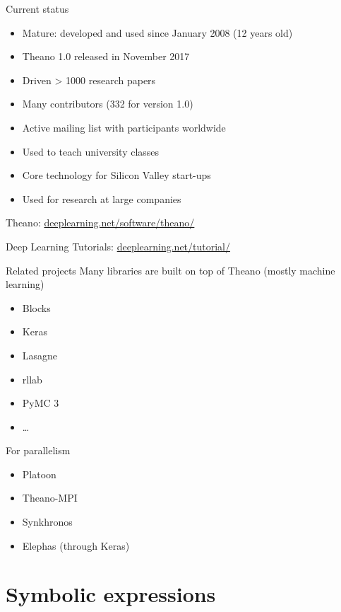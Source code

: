 \documentclass[a4paper,9pt]{beamer}
\begin{document}
\begin{frame}[fragile]{Current status}
  \begin{itemize}
    \item Mature: developed and used since January 2008 (12 years old)
    \item Theano 1.0 released in November 2017
    \item Driven > 1000 research papers
    \item Many contributors (332 for version 1.0)
    \item Active mailing list with participants worldwide
    \item Used to teach university classes
    \item Core technology for Silicon Valley start-ups
    \item Used for research at large companies
  \end{itemize}
  Theano: \url{deeplearning.net/software/theano/}

  Deep Learning Tutorials: \url{deeplearning.net/tutorial/}
\end{frame}

\begin{frame}{Related projects}
  Many libraries are built on top of Theano (mostly machine learning)
  \begin{itemize}
    \item Blocks
    \item Keras
    \item Lasagne
    \item rllab
    \item PyMC 3
    \item \ldots
  \end{itemize}
  For parallelism
  \begin{itemize}
    \item Platoon
    \item Theano-MPI
    \item Synkhronos
    \item Elephas (through Keras)
  \end{itemize}
\end{frame}


\section{Symbolic expressions}
\begin{frame}
  \tableofcontents[currentsection]
\end{frame}
\end{document}
